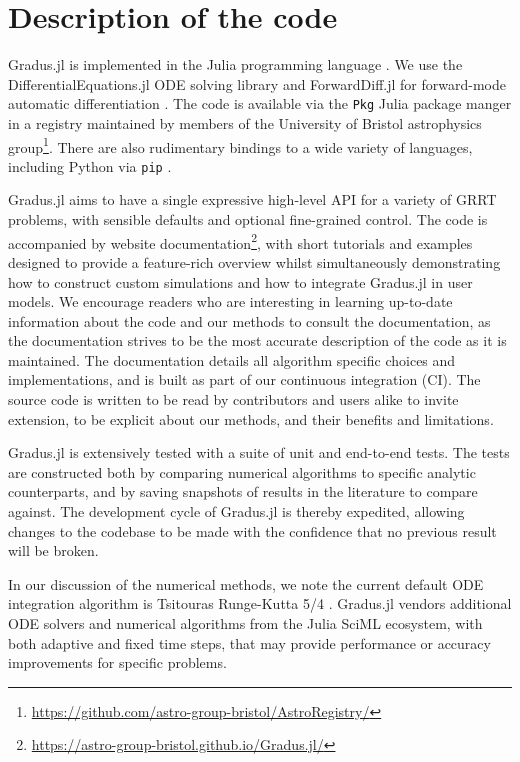 \documentclass[fleqn,usenatbib]{mnras}
\newcommand{\Gradus}{Gradus.jl }
\begin{document}
\section{Description of the code}

\Gradus is implemented in the Julia programming language \citep{Bezanson_Julia_A_fresh_2017}. We use the DifferentialEquations.jl ODE solving library and ForwardDiff.jl for forward-mode automatic differentiation \citep{RevelsLubinPapamarkou2016}. The code is available via the \texttt{Pkg} Julia package manger in a registry maintained by members of the University of Bristol astrophysics group\footnote{\url{https://github.com/astro-group-bristol/AstroRegistry/}}. There are also rudimentary bindings to a wide variety of languages, including Python via \texttt{pip} \citep{}.

\Gradus aims to have a single expressive high-level API for a variety of GRRT problems, with sensible defaults and optional fine-grained control. The code is accompanied by website documentation\footnote{\url{https://astro-group-bristol.github.io/Gradus.jl/}}, with short tutorials and examples designed to provide a feature-rich overview whilst simultaneously demonstrating how to construct custom simulations and how to integrate \Gradus in user models. We encourage readers who are interesting in learning up-to-date information about the code and our methods to consult the documentation, as the documentation strives to be the most accurate description of the code as it is maintained. The documentation details all algorithm specific choices and implementations, and is built as part of our continuous integration (CI). The source code is written to be read by contributors and users alike to invite extension, to be explicit about our methods, and their benefits and limitations.

\Gradus is extensively tested with a suite of unit and end-to-end tests. The tests are constructed both by comparing numerical algorithms to specific analytic counterparts, and by saving snapshots of results in the literature to compare against. The development cycle of \Gradus is thereby expedited, allowing changes to the codebase to be made with the confidence that no previous result will be broken.

In our discussion of the numerical methods, we note the current default ODE integration algorithm is Tsitouras Runge-Kutta 5/4 \citep{tsitouras_rungekutta_2011}. \Gradus vendors additional ODE solvers and numerical algorithms from the Julia SciML ecosystem, with both adaptive and fixed time steps, that may provide performance or accuracy improvements for specific problems.
\end{document}
